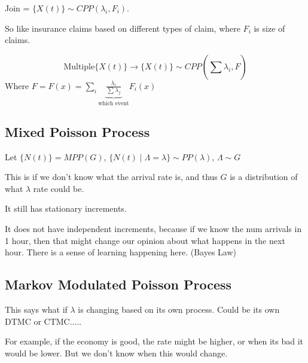 \documentclass{report}
\begin{document}
\vspace{5mm}
Join = $ \{X(t)\} \sim CPP(\lambda_{i}, F_{i} )$. 

So like insurance claims based on different types of claim, where $ F_{i} $ is size of claims. 

\[
\text{Multiple} \{X(t)\} \to \{X(t)\} \sim CPP(\sum_{}^{}\lambda_{i}, F)
\]
Where $ F = F(x) = \sum_{i}^{} \underbrace{\frac{\lambda_{i}}{\sum_{}^{}\lambda _{j}}}_{\text{which event}} F_{i}(x) $ 


\subsection{Mixed Poisson Process}

Let $ \{N(t)\} = MPP(G) $, $ \{N(t) \mid \Lambda = \lambda\} \sim PP(\lambda)  $, $ \Lambda \sim G $ 

\noindent
This is if we don't know what the arrival rate is, and thus $ G $ is a distribution of what $ \lambda $ rate could be. 

It still has stationary increments. 

It does not have independent increments, because if we know the num arrivals in 1 hour, then that might change our opinion about what happens in the next hour. There is a sense of learning happening here.  (Bayes Law) 

\subsection{Markov Modulated Poisson Process} 

This says what if $ \lambda $ is changing based on its own process. Could be its own DTMC or CTMC.....

For example, if the economy is good, the rate might be higher, or when its bad it would be lower. But we don't know when this would change. 
\end{document}
